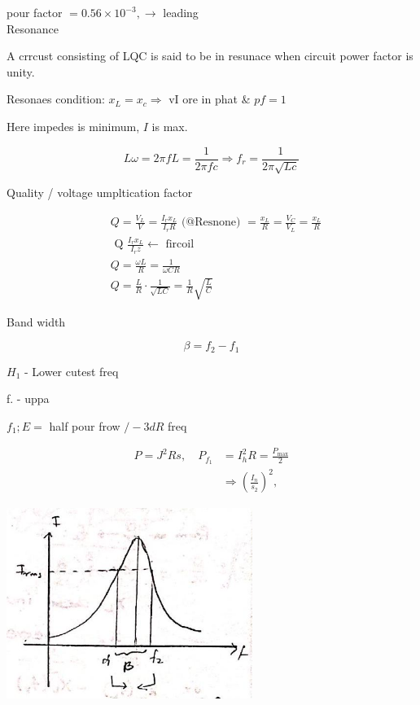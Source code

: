 \documentclass[12pt, a4paper]{article}
\newcommand{\figwidth}{8cm}
\begin{document}
	pour factor $=0.56 \times 10^{-3}, \rightarrow$ leading\\
	Resonance

	A crrcust consisting of LQC is said to be in resunace when circuit power factor is unity.

	Resonaes condition: $x_{L}=x_{c} \Rightarrow$ vI ore in phat \& $p f=1$

	Here impedes is minimum, $I$ is max.

	$$
		L \omega=2 \pi f L=\frac{1}{2 \pi f c} \Rightarrow f_{r}=\frac{1}{2 \pi \sqrt{L c}}
	$$

	Quality / voltage umpltication factor

	$$
		\begin{aligned}
			 & Q=\frac{V_{L}}{V}=\frac{I_{r} x_{L}}{I_{r} R} \text { (@Resnone) }=\frac{x_{L}}{R}=\frac{V_{C}}{V_{L}}=\frac{x_{L}}{R} \\
			 & \text { Q } \frac{I_{r} x_{L}}{I_{r} z} \leftarrow \text { fircoil }                                                   \\
			 & Q=\frac{\omega L}{R}=\frac{1}{\omega C R}                                                                              \\
			 & Q=\frac{L}{R} \cdot \frac{1}{\sqrt{L C}}=\frac{1}{R} \sqrt{\frac{L}{C}}
		\end{aligned}
	$$

	Band width

	$$
		\beta=f_{2}-f_{1}
	$$

$H_{1}$ - Lower cutest freq

	f. - uppa

$f_{1} ; E=$ half pour frow $/-3 d R$ freq

	$$
		\begin{aligned}
			P=J^{2} R s, \quad P_{f_{1}} & =I_{h}^{2} R=\frac{P_{\max }}{2}                 \\
			                             & \Rightarrow\left(\frac{I_{n}}{s_{2}}\right)^{2},
		\end{aligned}
	$$

	\begin{center}
		\includegraphics[max width=\figwidth]{2024_06_15_74bbabba7981675b0d49g-08(1)}
	\end{center}
\end{document}
